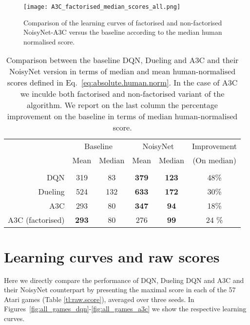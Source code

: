 \documentclass{article}
\newcommand{\algoinit}{NoisyNet}
\begin{document}
\label{sec:appx.factor.A3C}

\begin{figure}[!htp]
\begin{centering}
    \texttt{[image: A3C\_factorised\_median\_scores\_all.png]}
    \caption{Comparison of the learning curves of factorised and non-factorised NoisyNet-A3C versus the baseline according to the median human normalised score.}
    \label{fig:learning curves median facotrised} 
    \end{centering}
\end{figure}


\begin{table}[ht!]
\centering
\begin{tabular}{rccccc}
\toprule
 & \multicolumn{2}{c}{Baseline} & \multicolumn{2}{c}{\algoinit{}}&Improvement \\
 & Mean & Median & Mean & Median& (On median) \\
 \hline
 \\
DQN & 319 & 83 & \textbf{379} & \textbf{123} & 48\%\\ 
Dueling & 524 & 132 & \textbf{633} & \textbf{172} & 30\% \\
A3C & 293 & 80 & \textbf{347} & \textbf{94} &  18\%\\
A3C (factorised) & \textbf{293} & 80 & 276 & \textbf{99} & 24  \%\\
\bottomrule
\end{tabular}
\caption{Comparison between the baseline DQN, Dueling and A3C   and their \algoinit{} version in terms of median and mean human-normalised scores defined in Eq.~\eqref{eq:absolute.human.norm}. In the case of A3C we inculde both factorised and non-factorised variant of the algorithm. We report on the last column the percentage  improvement on the baseline in terms of median human-normalised score.}
\label{table:factorised}
\end{table}



\newpage
\section{Learning curves and raw scores}
\label{sec:learning_curves}

Here we directly compare the performance of DQN, Dueling DQN and A3C and their NoisyNet counterpart by presenting the maximal score in each of the 57 Atari games (Table \ref{tl:raw.score}), averaged over three seeds. In Figures~\ref{fig:all_games_dqn}-\ref{fig:all_games_a3c} we show the respective learning curves. 
\end{document}
